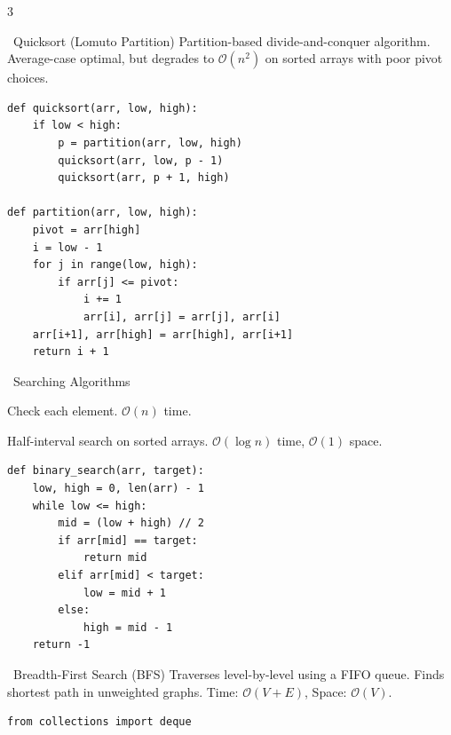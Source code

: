 \documentclass[10pt,landscape,letterpaper]{article}
\begin{document}
\begin{multicols*}{3}
\begin{topicbox}{\faCode~Quicksort (Lomuto Partition)}
  \scriptsize Partition-based divide-and-conquer algorithm. Average-case optimal, but degrades to $\mathcal{O}(n^2)$ on sorted arrays with poor pivot choices.
  \vspace{3pt}
  \begin{lstlisting}
def quicksort(arr, low, high):
    if low < high:
        p = partition(arr, low, high)
        quicksort(arr, low, p - 1)
        quicksort(arr, p + 1, high)

def partition(arr, low, high):
    pivot = arr[high]
    i = low - 1
    for j in range(low, high):
        if arr[j] <= pivot:
            i += 1
            arr[i], arr[j] = arr[j], arr[i]
    arr[i+1], arr[high] = arr[high], arr[i+1]
    return i + 1
  \end{lstlisting}
\end{topicbox}

\columnbreak

\begin{accentbox}{\faSearch~Searching Algorithms}
  \scriptsize
  \begin{description}[leftmargin=3pt,itemsep=2pt,topsep=2pt,parsep=0pt]
    \item[\color{primary}Linear Search:] Check each element. $\mathcal{O}(n)$ time.
    \item[\color{primary}Binary Search:] Half-interval search on sorted arrays. $\mathcal{O}(\log n)$ time, $\mathcal{O}(1)$ space.
  \end{description}
  \vspace{2pt}
  \begin{lstlisting}
def binary_search(arr, target):
    low, high = 0, len(arr) - 1
    while low <= high:
        mid = (low + high) // 2
        if arr[mid] == target:
            return mid
        elif arr[mid] < target:
            low = mid + 1
        else:
            high = mid - 1
    return -1
  \end{lstlisting}
\end{accentbox}

\begin{topicbox}{\faProjectDiagram~Breadth-First Search (BFS)}
  \scriptsize Traverses level-by-level using a FIFO queue. Finds shortest path in unweighted graphs. Time: $\mathcal{O}(V + E)$, Space: $\mathcal{O}(V)$.
  \vspace{3pt}
  \begin{lstlisting}
from collections import deque


\end{lstlisting}
\end{topicbox}
\end{multicols*}
\end{document}
